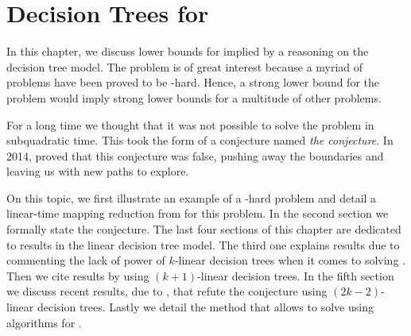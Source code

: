 \chapter{Decision Trees for \threeSUM}
\label{tree:3sum}

In this chapter, we discuss lower bounds for \threeSUM implied by a
reasoning on the decision tree model. The \threeSUM problem is of great
interest because a myriad of problems
have been proved to be \threeSUM-hard. Hence, a strong lower bound for
the \threeSUM problem would imply strong lower bounds for a multitude of other
problems.

For a long time we thought that it was not possible to solve the \threeSUM
problem in subquadratic time. This took the form of a
conjecture named \emph{the \threeSUM conjecture}. In 2014, \citet*{gronlund:2014}
proved that this conjecture was false, pushing away the
boundaries and leaving us with new paths to explore.

On this topic, we first illustrate an example of a \threeSUM-hard problem
and detail a linear-time mapping reduction from \threeSUM for this problem. In
the second section we formally state the \threeSUM conjecture. The last
four sections of this chapter are dedicated to results in the linear
decision tree model. The third one explains results due to
\citet*{erickson:1999} commenting the lack of power of $k$-linear decision
trees when it comes to solving \ksum. Then we cite results by
\citet*{ailon:2005} using $(k+1)$-linear decision trees. In the fifth section
we discuss recent results, due to \citet*{gronlund:2014}, that refute
the \threeSUM conjecture using $(2k-2)$-linear decision trees. Lastly we
detail the method that allows to solve \kLDT using algorithms for \threeSUM.
